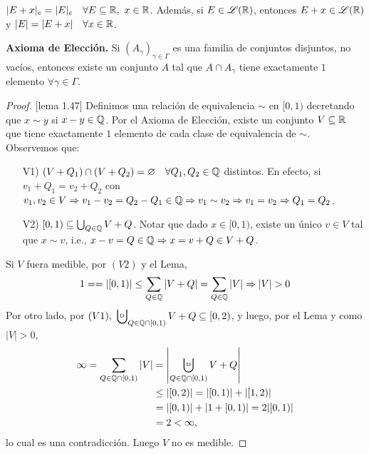 \begin{lemma}
	$|E + x|_{e} = |E|_{e} \quad \forall E \subseteq \mathbb{R},\ x \in \mathbb{R}$. Además, si $E \in \mathscr{L}(\mathbb{R})$, entonces $E+x \in \mathscr{L}(\mathbb{R})$ y $|E| = |E + x| \quad \forall x \in \mathbb{R}$.
\end{lemma}
\medskip
\noindent \textbf{Axioma de Elección.} Si $(A_{\gamma})_{\gamma\in\Gamma}$ es una familia de conjuntos disjuntos, no vacíos, entonces existe un conjunto $A$ tal que $A \cap A_{\gamma}$ tiene exactamente $1$ elemento $\forall \gamma \in \Gamma$.

\begin{proof}[Proof][lema 1.47]
	Definimos una relación de equivalencia $\sim$ en $[0,1)$ decretando que $x \sim y$ si $x-y \in \mathbb{Q}$. Por el Axioma de Elección, existe un conjunto $V \subseteq \mathbb{R}$ que tiene exactamente $1$ elemento de cada clase de equivalencia de $\sim$. Observemos que:
	\begin{enumerate}
		\item[V1)] $(V + Q_1) \cap (V + Q_2) = \varnothing \quad \forall Q_1,Q_2 \in \mathbb{Q}$ distintos. En efecto, si $v_1 + Q_1 = v_2 + Q_2$ con $v_1,v_2 \in V \Rightarrow v_1 - v_2 = Q_2 - Q_1 \in \mathbb{Q} \Rightarrow v_1 \sim v_2 \Rightarrow v_1 = v_2 \Rightarrow Q_1 = Q_2$.

		\item[V2)] $[0,1) \subseteq \bigcup_{Q \in \mathbb{Q}} V + Q$. Notar que dado $x\in[0,1)$, existe un único $v \in V$ tal que $x \sim v$, i.e., $x-v = Q \in \mathbb{Q} \Rightarrow x = v + Q \in V + Q$.
	\end{enumerate}
	Si $V$ fuera medible, por $(V2)$ y el Lema,
	\[ 1 = = |[0,1)| \leq \sum_{Q \in \mathbb{Q}} |V+Q| = \sum_{Q\in\mathbb{Q}} |V| \Rightarrow |V| > 0 \]
	Por otro lado, por $(V1),\ \bigcupd_{Q \in \Q \cap [0,1)} V+Q \subseteq [0,2)$, y luego, por el Lema y como $|V| > 0$,
	\begin{align*}
		\infty = \sum_{Q \in \Q \cap [0,1)} |V| &= \left| \bigcupd_{Q\in\Q\cap[0,1)} V+Q \right| \\
		& \leq |[0,2)| = |[0,1)| + |[1,2)| \\
		&= |[0,1)| + | 1 + [0,1)| = 2|[0,1)| \\
		&= 2 < \infty
	,\end{align*}
	lo cual es una contradicción. Luego $V$ no es medible.
\end{proof}
